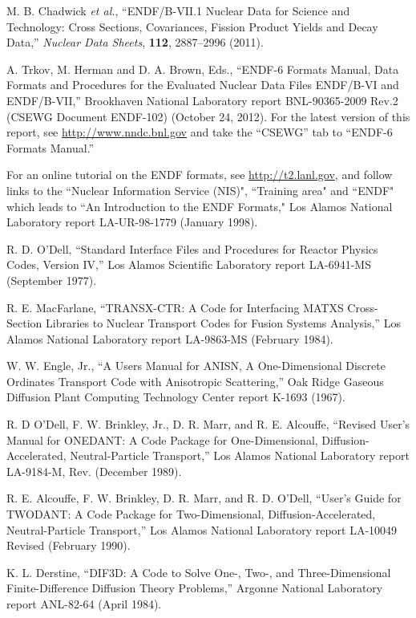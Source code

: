\documentclass[11pt,twoside]{NJOYMan}
\begin{document}
\begin{thebibliography}{99}
\begin{singlespace}
 M. B. Chadwick {\it et al.}, ``ENDF/B-VII.1 Nuclear
  Data for Science and Technology:  Cross Sections, Covariances,
  Fission Product Yields and Decay Data,'' {\it Nuclear Data Sheets},
  {\bf 112}, 2887--2996 (2011).

 A. Trkov, M. Herman and D. A. Brown, Eds., ``ENDF-6
  Formats Manual, Data Formats and Procedures for the Evaluated Nuclear
  Data Files ENDF/B-VI and ENDF/B-VII,'' Brookhaven National Laboratory
  report BNL-90365-2009 Rev.2 (CSEWG Document
  ENDF-102) (October 24, 2012). For the latest version of
  this report, see \href{http://www.nndc.bnl.gov}{http://www.nndc.bnl.gov}
  and take the ``CSEWG'' tab to ``ENDF-6 Formats Manual.''

 For an online tutorial on the ENDF formats,
 see \href{http://t2.lanl.gov}{http://t2.lanl.gov}, and follow links
 to the ``Nuclear Information Service (NIS)", ``Training area"
 and ``ENDF" which leads to ``An Introduction to the ENDF Formats,"
 Los Alamos National Laboratory report LA-UR-98-1779 (January 1998).

 R. D. O'Dell, ``Standard Interface Files and
  Procedures for Reactor Physics Codes, Version IV,'' Los Alamos
  Scientific Laboratory report LA-6941-MS (September 1977).

 R. E. MacFarlane,  ``TRANSX-CTR: A Code for
  Interfacing MATXS Cross-Section Libraries to Nuclear Transport
  Codes for Fusion Systems Analysis,'' Los Alamos National
  Laboratory report LA-9863-MS (February 1984).

 W. W. Engle, Jr., ``A Users Manual for ANISN,
  A One-Dimensional Discrete Ordinates Transport Code with
  Anisotropic Scattering,'' Oak Ridge Gaseous Diffusion Plant
  Computing Technology Center report K-1693 (1967).

 R. D O'Dell, F. W. Brinkley, Jr.,
  D. R. Marr, and R. E. Alcouffe, ``Revised User's
  Manual for ONEDANT: A Code Package for One-Dimensional,
  Diffusion-Accelerated, Neutral-Particle Transport,''
  Los Alamos National Laboratory report LA-9184-M, Rev.
  (December 1989).

 R. E. Alcouffe, F. W. Brinkley, D. R. Marr,
  and R. D. O'Dell, ``User's Guide for TWODANT: A Code Package
  for Two-Dimensional, Diffusion-Accelerated, Neutral-Particle
  Transport,'' Los Alamos National Laboratory report
  LA-10049 Revised (February 1990).

 K. L. Derstine, ``DIF3D: A Code to Solve One-,
  Two-, and Three-Dimensional Finite-Difference Diffusion Theory
  Problems,'' Argonne National Laboratory report ANL-82-64
  (April 1984).


\end{singlespace}
\end{thebibliography}
\end{document}
